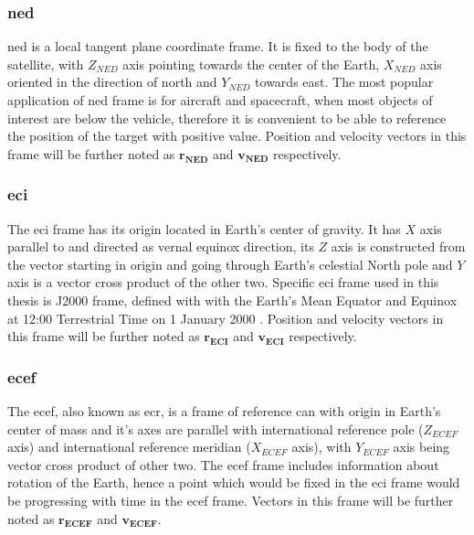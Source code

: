     \subsubsection{\ac*{ned}}
        \ac{ned} is a local tangent plane coordinate frame. It is fixed to the body of the satellite, with $Z_{NED}$ axis pointing towards the center of the Earth, $X_{NED}$ axis oriented in the direction of north and $Y_{NED}$ towards east. The most popular application of \ac{ned} frame is for aircraft and spacecraft, when most objects of interest are below the vehicle, therefore it is convenient to be able to reference the position of the target with positive value. Position and velocity vectors in this frame will be further noted as $\textbf{r}_\textbf{NED}$ and $\textbf{v}_\textbf{NED}$ respectively.

    \subsubsection{\ac*{eci}}
        The \ac{eci} frame has its origin located in Earth's center of gravity. It has $X$ axis parallel to and directed as vernal equinox direction, its $Z$ axis is constructed from the vector starting in origin and going through Earth's celestial North pole and $Y$ axis is a vector cross product of the other two. Specific \ac{eci} frame used in this thesis is J2000 frame, defined with with the Earth's Mean Equator and Equinox at 12:00 Terrestrial Time on 1 January 2000 \cite{schutz2004statistical}. Position and velocity vectors in this frame will be further noted as $\textbf{r}_\textbf{ECI}$ and $\textbf{v}_\textbf{ECI}$ respectively.

    \subsubsection{\ac*{ecef}}
        The \ac{ecef}, also known as \ac{ecr}, is a frame of reference can with origin in Earth's center of mass and it's axes are parallel with international reference pole ($Z_{ECEF}$ axis) and international reference meridian ($X_{ECEF}$ axis), with $Y_{ECEF}$ axis being vector cross product of other two. The \ac{ecef} frame includes information about rotation of the Earth, hence a point which would be fixed in the \ac{eci} frame would be progressing with time in the \ac{ecef} frame. Vectors in this frame will be further noted as $\textbf{r}_{\textbf{ECEF}}$ and $\textbf{v}_{\textbf{ECEF}}$.


